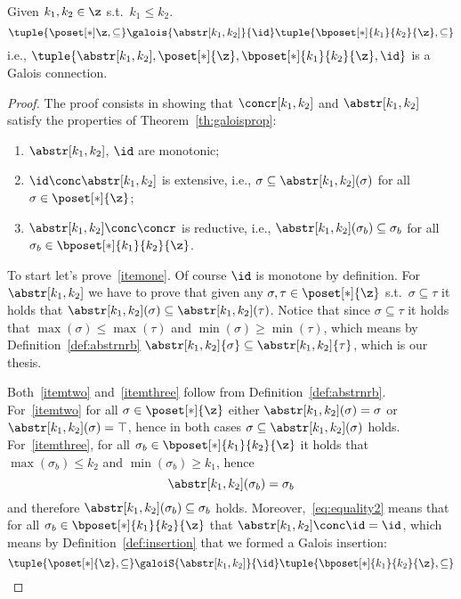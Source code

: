 \begin{lemma}
  Given \(k_1, k_2 \in \z\) s.t.\ \(k_1\leq k_2\).
  \begin{equation*}
    \tuple{\poset[*]\z, \subseteq} \galois{\abstr[k_1,k_2]}{\id} \tuple{\bposet[*]{k_1}{k_2}{\z}, \subseteq}
  \end{equation*}
  i.e.,
  \(\tuple{\abstr[k_1,k_2], \poset[*]{\z},
    {\bposet[*]{k_1}{k_2}{\z}}, \id}\) is a Galois connection.
\end{lemma} 

\begin{proof}
  The proof consists in showing that \(\concr[k_1,k_2]\) and
  \(\abstr[k_1,k_2]\) satisfy the properties of
  Theorem~\ref{th:galoisprop}:
  \begin{enumerate}[label={(\arabic*)}]
  \item\label{itemone} \(\abstr[k_1,k_2]\), \(\id\) are monotonic;
  \item\label{itemtwo} \(\id \conc \abstr[k_1, k_2]\) is extensive, i.e.,
    \(\sigma \subseteq \abstr[k_1,k_2](\sigma)\) for all
    \(\sigma \in \poset[*]{\z}\);
  \item\label{itemthree} \(\abstr[k_1,k_2] \conc\concr\) is reductive, i.e.,
    \(\abstr[k_1,k_2](\sigma_b) \subseteq \sigma_b\) for all
    \(\sigma_b \in \bposet[*]{k_1}{k_2}{\z}\).
  \end{enumerate}
  To start let's prove~\ref{itemone}. Of course \(\id\) is monotone by
  definition. For \(\abstr[k_1,k_2]\) we have to prove that given any
  \(\sigma, \tau \in \poset[*]{\z}\) s.t.\ \(\sigma \subseteq \tau\)
  it holds that
  \(\abstr[k_1,k_2](\sigma) \subseteq \abstr[k_1,k_2](\tau)\). Notice
  that since \(\sigma \subseteq \tau\) it holds that
  \(\max(\sigma) \leq \max(\tau)\) and
  \(\min(\sigma) \geq \min(\tau)\), which means by
  Definition~\ref{def:abstrnrb}
  \(\abstr[k_1,k_2]{\sigma} \subseteq \abstr[k_1,k_2]{\tau}\), which
  is our thesis.

  \medskip

  \noindent
  Both~\ref{itemtwo} and~\ref{itemthree} follow from
  Definition~\ref{def:abstrnrb}. For~\ref{itemtwo} for all
  \(\sigma \in \poset[*]{\z}\) either
  \(\abstr[k_1,k_2]({\sigma}) = \sigma\) or
  \(\abstr[k_1,k_2]({\sigma}) = \top\), hence in both cases
  \(\sigma \subseteq \abstr[k_1,k_2]({\sigma})\)
  holds. For~\ref{itemthree}, for all
  \(\sigma_b \in \bposet[*]{k_1}{k_2}{\z}\) it holds that
  \(\max(\sigma_b) \leq k_2\) and \(\min(\sigma_b) \geq k_1\), hence
  \begin{equation}\label{eq:equality2}
    \abstr[k_1,k_2]({\sigma_b}) = \sigma_b
  \end{equation}
  and therefore \(\abstr[k_1,k_2]({\sigma_b}) \subseteq \sigma_b\)
  holds.  Moreover,~\eqref{eq:equality2} means that for all
  \(\sigma_b \in \bposet[*]{k_1}{k_2}{\z}\) that
  \(\abstr[k_1,k_2] \conc \id = \id\), which means by
  Definition~\ref{def:insertion} that we formed a Galois insertion:
  \begin{equation*}
    \tuple{\poset[*]{\z}, \subseteq} \galoiS{\abstr[k_1,k_2]}{\id} \tuple{\bposet[*]{k_1}{k_2}{\z}, \subseteq}
  \end{equation*}
\end{proof}

